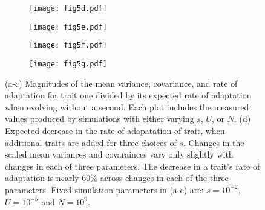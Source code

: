 \documentclass[11pt,twocolumn]{article}
\begin{document}
\begin{figure}[h!]
\begin{subfigure}[b!]{0.48\linewidth}
\centering
\texttt{[image: fig5d.pdf]}
\caption{}\label{fig:2a}
\end{subfigure}
\begin{subfigure}[b!]{0.48\linewidth}
\centering
\texttt{[image: fig5e.pdf]}
\caption{}\label{fig:2b}
\end{subfigure}

\begin{subfigure}[b]{0.48\linewidth}
\centering
\texttt{[image: fig5f.pdf]}
\caption{}\label{fig:2c}
\end{subfigure}
\begin{subfigure}[b]{0.48\linewidth}
\centering
\texttt{[image: fig5g.pdf]}
\caption{}\label{fig:2d}
\end{subfigure}
\caption{\footnotesize 
(a-c) Magnitudes of the mean variance, covariance, and rate of adaptation for trait one divided by its expected rate of adaptation when evolving without a second. Each plot includes the measured values produced by simulations with either varying $s$, $U$, or $N$. (d) Expected decrease in the rate of adapatation of trait, when additional traits are added for three choices of $s$. Changes in the scaled mean variances and covarainces vary only slightly with changes in each of three parameters. The decrease in a trait's rate of adaptation is nearly 60\% across changes in each of the three parameters. Fixed simulation parameters in (a-c) are: $s=10^{-2}$, $U=10^{-5}$ and $N=10^9$.}\label{fig:2}
\end{figure}
\end{document}
